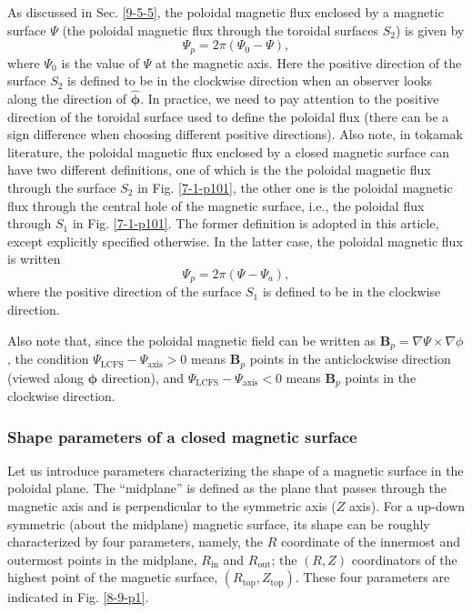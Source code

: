 \documentclass{article}
\newcommand{\tmmathbf}[1]{\ensuremath{\boldsymbol{#1}}}
\newcommand{\tmop}[1]{\ensuremath{\operatorname{#1}}}
\begin{document}
As discussed in Sec. \ref{9-5-5}, the poloidal magnetic flux enclosed by a
magnetic surface $\Psi$ (the poloidal magnetic flux through the toroidal
surfaces $S_2$) is given by
\begin{equation}
  \label{12-30-2} \Psi_p = 2 \pi (\Psi_0 - \Psi),
\end{equation}
where $\Psi_0$ is the value of $\Psi$ at the magnetic axis. Here the positive
direction of the surface $S_2$ is defined to be in the clockwise direction
when an observer looks along the direction of $\hat{\tmmathbf{\phi}}$. In
practice, we need to pay attention to the positive direction of the toroidal
surface used to define the poloidal flux (there can be a sign difference when
choosing different positive directions). Also note, in tokamak literature, the
poloidal magnetic flux enclosed by a closed magnetic surface can have two
different definitions, one of which is the the poloidal magnetic flux through
the surface $S_2$ in Fig. \ref{7-1-p101}, the other one is the poloidal
magnetic flux through the central hole of the magnetic surface, i.e., the
poloidal flux through $S_1$ in Fig. \ref{7-1-p101}. The former definition is
adopted in this article, except explicitly specified otherwise. In the latter
case, the poloidal magnetic flux is written
\begin{equation}
  \Psi_p = 2 \pi (\Psi - \Psi_a),
\end{equation}
where the positive direction of the surface $S_1$ is defined to be in the
clockwise direction.

Also note that, since the poloidal magnetic field can be written as
$\mathbf{B}_p = \nabla \Psi \times \nabla \phi$, the condition
$\Psi_{\tmop{LCFS}} - \Psi_{\tmop{axis}} > 0$ means $\mathbf{B}_p$ points in
the anticlockwise direction (viewed along $\tmmathbf{\phi}$ direction), and
$\Psi_{\tmop{LCFS}} - \Psi_{\tmop{axis}} < 0$ means $\mathbf{B}_p$ points in
the clockwise direction.

\subsubsection{Shape parameters of a closed magnetic surface}

Let us introduce parameters characterizing the shape of a magnetic surface in
the poloidal plane. The ``midplane'' is defined as the plane that passes
through the magnetic axis and is perpendicular to the symmetric axis ($Z$
axis). For a up-down symmetric (about the midplane) magnetic surface, its
shape can be roughly characterized by four parameters, namely, the $R$
coordinate of the innermost and outermost points in the midplane,
$R_{\tmop{in}}$ and $R_{\tmop{out}}$; the $(R, Z)$ coordinators of the highest
point of the magnetic surface, $(R_{\tmop{top}}, Z_{\tmop{top}})$. These four
parameters are indicated in Fig. \ref{8-9-p1}.
\end{document}
